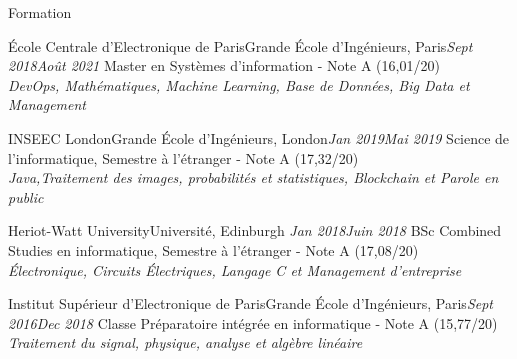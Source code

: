 \documentclass{resume}
\begin{document}
	\begin{rSection}{Formation}
		\begin{school}{École Centrale d'Electronique de Paris}{Grande École d'Ingénieurs, Paris}{\em Sept 2018}{\em Août 2021}{
			Master en Systèmes d'information  - Note A (16,01/20)  \\ 
			\textit{\small{DevOps, Mathématiques, Machine Learning, Base de Données, Big Data et Management}}
		}
		\end{school}

		\begin{school}{INSEEC London}{Grande École d'Ingénieurs, London}{\em Jan 2019}{\em Mai 2019}{
			Science de l'informatique, Semestre à l'étranger - Note A (17,32/20)  \\
			\textit{\small{Java,Traitement des images, probabilités et statistiques, Blockchain et Parole en public}}		
		}
		\end{school}
		
		\begin{school}{Heriot-Watt University}{Université, Edinburgh }{\em Jan 2018}{\em Juin 2018}{
			BSc Combined Studies en informatique,  Semestre à l'étranger - Note A (17,08/20) \\
			\textit{\small{Électronique, Circuits Électriques, Langage C et Management d'entreprise}}
		}	
		\end{school}

		\begin{school}{Institut Supérieur d'Electronique de Paris}{Grande École d'Ingénieurs, Paris}{\em Sept 2016}{\em Dec 2018}{
			Classe Préparatoire intégrée en informatique - Note A (15,77/20)\\
			\textit{\small{Traitement du signal, physique, analyse et algèbre linéaire}}
		}
		\end{school}
	\end{rSection}
\end{document}
